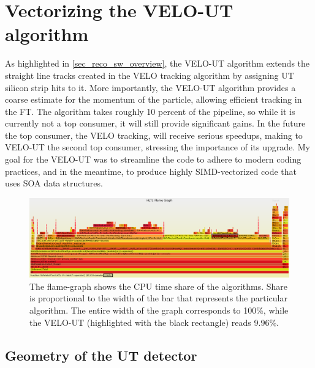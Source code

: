 \documentclass[12pt]{article}
\begin{document}
\newpage
\section{Vectorizing the VELO-UT algorithm}\label{sec_opt_velout}

As highlighted in \ref{sec_reco_sw_overview}, the VELO-UT algorithm extends the straight line tracks created in the VELO tracking algorithm by assigning UT silicon strip hits to it. More importantly, the VELO-UT algorithm provides a coarse estimate for the momentum of the particle, allowing efficient tracking in the FT.
The algorithm takes roughly 10 percent of the pipeline, so while it is currently not a top consumer, it will still provide significant gains. In the future the top consumer, the VELO tracking, will receive serious speedups, making to VELO-UT the second top consumer, stressing the importance of its upgrade. My goal for the VELO-UT was to streamline the code to adhere to modern coding practices, and in the meantime, to produce highly SIMD-vectorized code that uses SOA data structures.


\begin{figure}[H]
	\begin{center}
		\includegraphics[width=\textwidth]{velout_flamegraph}
	\end{center}
	\caption[CPU time share of the VELO-UT algorithm]{The flame-graph shows the CPU time share of the algorithms. Share is proportional to the width of the bar that represents the particular algorithm. The entire width of the graph corresponds to 100\%, while the VELO-UT (highlighted with the black rectangle) reads 9.96\%.}
	\label{fig_velout_flamegraph}
\end{figure}


\subsection{Geometry of the UT detector}
\end{document}
